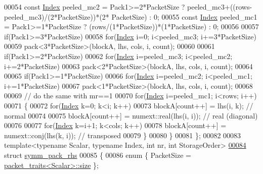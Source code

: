 \begin{DoxyCode}
00054     \textcolor{keyword}{const} \hyperlink{namespace_eigen_a62e77e0933482dafde8fe197d9a2cfde}{Index} peeled\_mc2 = Pack1>=2*PacketSize ? peeled\_mc3+((rows-peeled\_mc3)/(2*PacketSize))*(2*
      PacketSize) : 0;
00055     \textcolor{keyword}{const} \hyperlink{namespace_eigen_a62e77e0933482dafde8fe197d9a2cfde}{Index} peeled\_mc1 = Pack1>=1*PacketSize ? (rows/(1*PacketSize))*(1*PacketSize) : 0;
00056     
00057     \textcolor{keywordflow}{if}(Pack1>=3*PacketSize)
00058       \textcolor{keywordflow}{for}(\hyperlink{namespace_eigen_a62e77e0933482dafde8fe197d9a2cfde}{Index} i=0; i<peeled\_mc3; i+=3*PacketSize)
00059         pack<3*PacketSize>(blockA, lhs, cols, i, count);
00060     
00061     \textcolor{keywordflow}{if}(Pack1>=2*PacketSize)
00062       \textcolor{keywordflow}{for}(\hyperlink{namespace_eigen_a62e77e0933482dafde8fe197d9a2cfde}{Index} i=peeled\_mc3; i<peeled\_mc2; i+=2*PacketSize)
00063         pack<2*PacketSize>(blockA, lhs, cols, i, count);
00064     
00065     \textcolor{keywordflow}{if}(Pack1>=1*PacketSize)
00066       \textcolor{keywordflow}{for}(\hyperlink{namespace_eigen_a62e77e0933482dafde8fe197d9a2cfde}{Index} i=peeled\_mc2; i<peeled\_mc1; i+=1*PacketSize)
00067         pack<1*PacketSize>(blockA, lhs, cols, i, count);
00068 
00069     \textcolor{comment}{// do the same with mr==1}
00070     \textcolor{keywordflow}{for}(\hyperlink{namespace_eigen_a62e77e0933482dafde8fe197d9a2cfde}{Index} i=peeled\_mc1; i<rows; i++)
00071     \{
00072       \textcolor{keywordflow}{for}(\hyperlink{namespace_eigen_a62e77e0933482dafde8fe197d9a2cfde}{Index} k=0; k<i; k++)
00073         blockA[count++] = lhs(i, k);                   \textcolor{comment}{// normal}
00074 
00075       blockA[count++] = numext::real(lhs(i, i));       \textcolor{comment}{// real (diagonal)}
00076 
00077       \textcolor{keywordflow}{for}(\hyperlink{namespace_eigen_a62e77e0933482dafde8fe197d9a2cfde}{Index} k=i+1; k<cols; k++)
00078         blockA[count++] = numext::conj(lhs(k, i));     \textcolor{comment}{// transposed}
00079     \}
00080   \}
00081 \};
00082 
00083 \textcolor{keyword}{template}<\textcolor{keyword}{typename} Scalar, \textcolor{keyword}{typename} Index, \textcolor{keywordtype}{int} nr, \textcolor{keywordtype}{int} StorageOrder>
\hyperlink{struct_eigen_1_1internal_1_1symm__pack__rhs}{00084} \textcolor{keyword}{struct }\hyperlink{struct_eigen_1_1internal_1_1symm__pack__rhs}{symm\_pack\_rhs}
00085 \{
00086   \textcolor{keyword}{enum} \{ PacketSize = \hyperlink{struct_eigen_1_1internal_1_1packet__traits}{packet\_traits<Scalar>::size} \};

\end{DoxyCode}
